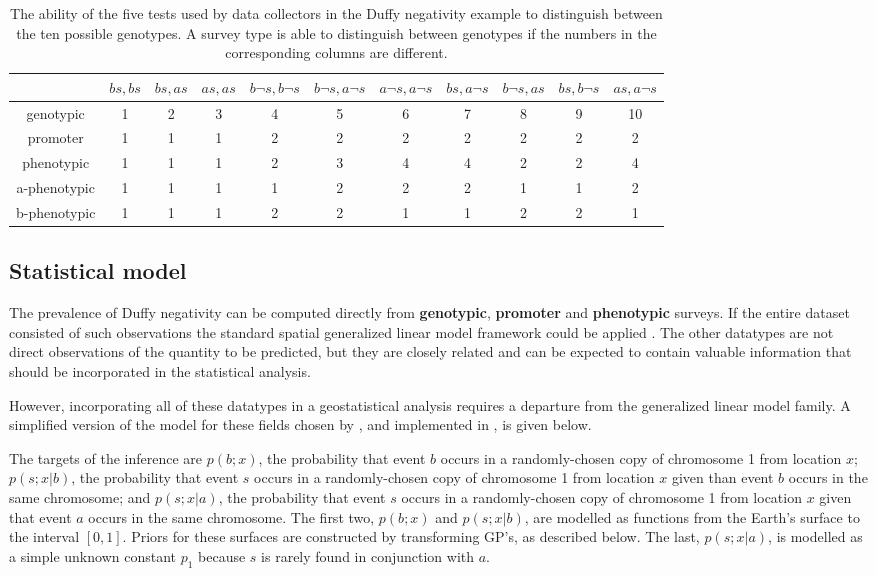 \documentclass[article]{jss}
\begin{document}
\begin{table}
    \centering
    \begin{small}
        \begin{tabular}{ccccccccccc}
            &$bs,bs$&$bs,as$&$as,as$&$b\neg s,b\neg s$&$b\neg s,a\neg s$&$a\neg s,a\neg s$&$bs,a\neg s$&$b\neg s,as$&$bs,b\neg s$&$as,a\neg s$\\
            \hline\hline
            genotypic&1&2&3&4&5&6&7&8&9&10\\
            promoter&1&1&1&2&2&2&2&2&2&2\\
            phenotypic&1&1&1&2&3&4&4&2&2&4\\
            a-phenotypic&1&1&1&1&2&2&2&1&1&2\\
            b-phenotypic&1&1&1&2&2&1&1&2&2&1
            \label{tab:equiv-class}
        \end{tabular}            
    \end{small}
    \caption{The ability of the five tests used by data collectors in the Duffy negativity example to distinguish between the ten possible genotypes. A survey type is able to distinguish between genotypes if the numbers in the corresponding columns are different.}
    \label{tab:surveys}  
\end{table}

\subsection{Statistical model}
The prevalence of Duffy negativity can be computed directly from \textbf{genotypic}, \textbf{promoter} and \textbf{phenotypic} surveys. If the entire dataset consisted of such observations the standard spatial generalized linear model framework could be applied \citep{diggle}. The other datatypes are not direct observations of the quantity to be predicted, but they are closely related and can be expected to contain valuable information that should be incorporated in the statistical analysis.

However, incorporating all of these datatypes in a geostatistical analysis requires a departure from the generalized linear model family. A simplified version of the model for these fields chosen by \cite{Howes}, and implemented in , is given below. 

The targets of the inference are $p(b;x)$, the probability that event $b$ occurs in a randomly-chosen copy of chromosome 1 from location $x$; $p(s;x|b)$, the probability that event $s$ occurs in a randomly-chosen copy of chromosome 1 from location $x$ given than event $b$ occurs in the same chromosome; and $p(s;x|a)$, the probability that event $s$ occurs in a randomly-chosen copy of chromosome 1 from location $x$ given that event $a$ occurs in the same chromosome. The first two, $p(b;x)$ and $p(s;x|b)$, are modelled as functions from the Earth's surface to the interval $[0,1]$. Priors for these surfaces are constructed by transforming GP's, as described below. The last, $p(s;x|a)$, is modelled as a simple unknown constant $p_1$ because $s$ is rarely found in conjunction with $a$.
\end{document}

